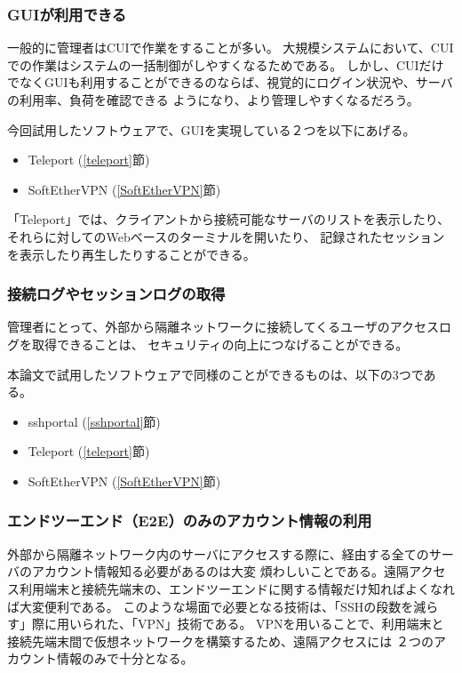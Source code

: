 \documentclass[11pt,a4j,titlepage]{jreport}
\begin{document}
\subsubsection*{GUIが利用できる}
一般的に管理者はCUIで作業をすることが多い。
大規模システムにおいて、CUIでの作業はシステムの一括制御がしやすくなるためである。
しかし、CUIだけでなくGUIも利用することができるのならば、視覚的にログイン状況や、サーバの利用率、負荷を確認できる
ようになり、より管理しやすくなるだろう。
\par 今回試用したソフトウェアで、GUIを実現している２つを以下にあげる。
\begin{itemize}
    \item Teleport (\ref{teleport}節)
    \item SoftEtherVPN (\ref{SoftEtherVPN}節)
\end{itemize}
「Teleport」では、クライアントから接続可能なサーバのリストを表示したり、それらに対してのWebベースのターミナルを開いたり、
記録されたセッションを表示したり再生したりすることができる。


\subsubsection*{接続ログやセッションログの取得}
管理者にとって、外部から隔離ネットワークに接続してくるユーザのアクセスログを取得できることは、
セキュリティの向上につなげることができる。

\par 本論文で試用したソフトウェアで同様のことができるものは、以下の3つである。
\begin{itemize}
    \item sshportal (\ref{sshportal}節)
    \item Teleport (\ref{teleport}節)
    \item SoftEtherVPN (\ref{SoftEtherVPN}節)
\end{itemize}


\subsubsection*{エンドツーエンド（E2E）のみのアカウント情報の利用}
外部から隔離ネットワーク内のサーバにアクセスする際に、経由する全てのサーバのアカウント情報知る必要があるのは大変
煩わしいことである。遠隔アクセス利用端末と接続先端末の、エンドツーエンドに関する情報だけ知ればよくなれば大変便利である。
このような場面で必要となる技術は、「SSHの段数を減らす」際に用いられた、「VPN」技術である。
VPNを用いることで、利用端末と接続先端末間で仮想ネットワークを構築するため、遠隔アクセスには
２つのアカウント情報のみで十分となる。
\end{document}
